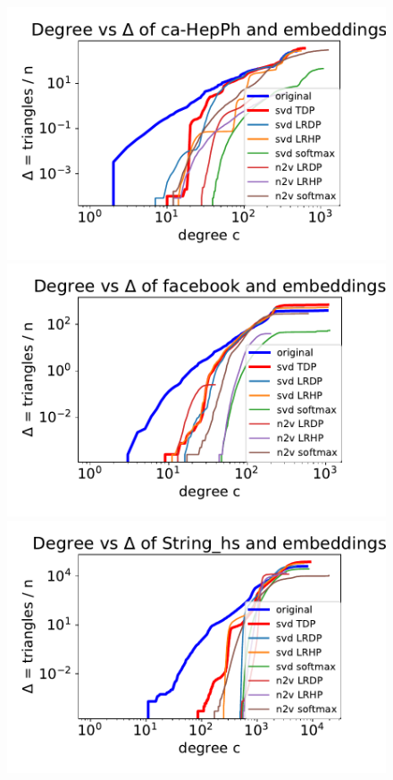 \documentclass[11pt]{article}
\begin{document}
\begin{figure}
        \includegraphics[scale=.35]{submissions/Seshadri2023/figures/ca-HepPh_tri_distro.pdf}
        \includegraphics[scale=.35]{submissions/Seshadri2023/figures/facebook_tri_distro.pdf}
        \includegraphics[scale=.35]{submissions/Seshadri2023/figures/String_hs_tri_distro.pdf} 

\end{figure}
\end{document}
